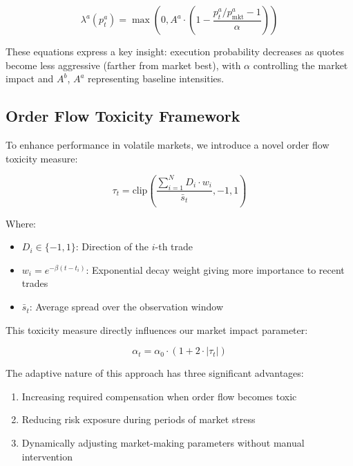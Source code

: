 \documentclass[onecolumn,ieee]{arithmaxresearch}
\begin{document}
\begin{equation}
\lambda^a(p^a_t) = \max\left(0, A^a \cdot \left(1 - \frac{p^a_t/p^a_{\text{mkt}} - 1}{\alpha}\right)\right)
\end{equation}

These equations express a key insight: execution probability decreases as quotes become less aggressive (farther from market best), with $\alpha$ controlling the market impact and $A^b$, $A^a$ representing baseline intensities.

\subsection{Order Flow Toxicity Framework}

To enhance performance in volatile markets, we introduce a novel order flow toxicity measure:

\begin{equation}
\tau_t = \text{clip}\left(\frac{\sum_{i=1}^N D_i \cdot w_i}{\bar{s}_t}, -1, 1\right)
\end{equation}

Where:
\begin{itemize}
    \item $D_i \in \{-1, 1\}$: Direction of the $i$-th trade
    \item $w_i = e^{-\beta(t-t_i)}$: Exponential decay weight giving more importance to recent trades
    \item $\bar{s}_t$: Average spread over the observation window
\end{itemize}

This toxicity measure directly influences our market impact parameter:

\begin{equation}
\alpha_t = \alpha_0 \cdot (1 + 2 \cdot |\tau_t|)
\end{equation}

The adaptive nature of this approach has three significant advantages:
\begin{enumerate}
    \item Increasing required compensation when order flow becomes toxic
    \item Reducing risk exposure during periods of market stress
    \item Dynamically adjusting market-making parameters without manual intervention
\end{enumerate}
\end{document}
